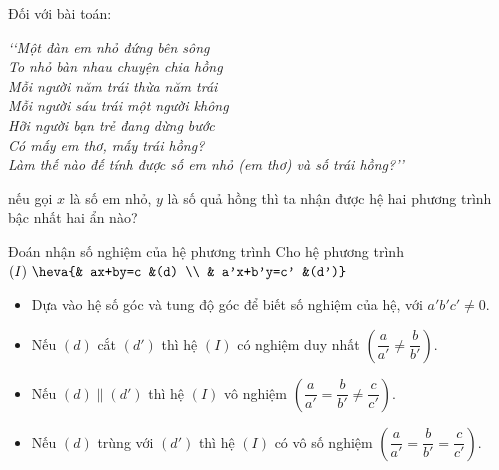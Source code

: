 \begin{vd}
	Đối với bài toán:
	\begin{center}
	\textit{\lq\lq Một đàn em nhỏ đứng bên sông\\
	To nhỏ bàn nhau chuyện chia hồng\\
	Mỗi người năm trái thừa năm trái\\
	Mỗi người sáu trái một người không\\
	Hỡi người bạn trẻ đang dừng bước\\
	Có mấy em thơ, mấy trái hồng?\\
	Làm thế nào đế tính được số em nhỏ (em thơ) và số trái hồng?\rq\rq}
	\end{center}
	nếu gọi $x$ là số em nhỏ, $ y $ là số quả hồng thì ta nhận được hệ hai phương trình bậc nhất hai ẩn nào?
\end{vd}
\begin{dang}{Đoán nhận số nghiệm của hệ phương trình}
	Cho hệ phương trình 
	$(I)~\heva{& ax+by=c &(d) \\ & a'x+b'y=c' &(d')}$
	\begin{itemize}
	\item Dựa vào hệ số góc và tung độ góc để biết số nghiệm của hệ, với $a'b'c'\ne 0$.
	\item Nếu $(d)$ cắt $(d')$ thì hệ $(I)$ có nghiệm duy nhất
	$\left( \dfrac{a}{a'}\ne \dfrac{b}{b'}\right)$.
	\item Nếu $(d)\parallel (d')$ thì hệ $(I)$ vô nghiệm
	$\left( \dfrac{a}{a'}=\dfrac{b}{b'}\ne \dfrac{c}{c'}\right)$.
	\item Nếu $(d)$ trùng với $(d')$ thì hệ $(I)$ có vô số nghiệm
	$\left(\dfrac{a}{a'}=\dfrac{b}{b'}= \dfrac{c}{c'}\right)$.
	\end{itemize}
\end{dang}
